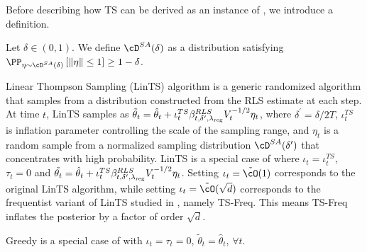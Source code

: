Before describing how TS can be derived as an instance of \POFUL{}, we introduce a definition.
%
\begin{definition}
Let $\delta \in (0,1)$. We define $\cD^{SA}(\delta)$ as a distribution satisfying 
	$	 
	\PP_{\eta \sim \cD^{SA}(\delta)}\left[\|\eta\| \leq 1\right] \geq 1 - \delta
	$.
\end{definition}


\begin{example}[TS]\label{ex:ts}	Linear Thompson Sampling (LinTS) algorithm is a generic randomized algorithm that samples from a distribution constructed from the RLS estimate at each step. At time $t$, LinTS samples as 
%
$
\tilde{\theta}_{t}  =\hat{\theta}_t +\iota^{TS}_t \beta_{t,\delta^\prime, \lambda_{\text{reg}}}^{RLS}  V_t^{-1/2} \eta_t
$,
%
where $\delta^\prime = \delta/2T$,  $\iota^{TS}_t$ is inflation parameter controlling the scale of the sampling range, and $\eta_t$ is a random sample from a normalized sampling distribution $\cD^{SA}(\delta^\prime)$ that concentrates with high probability. LinTS is a special case of \POFUL{} where  $\iota_t = \iota^{TS}_t$, $\tau_t = 0$ and 
$
\tilde{\theta_t} = \hat{\theta}_t +\iota^{TS}_t \beta_{t,\delta^\prime, \lambda_{\text{reg}}}^{RLS}  V_t^{-1/2} \eta_t
$.
%
Setting  $\iota_t = \tilde{\cO}(1)$ corresponds to the original LinTS algorithm, while  setting $\iota_t= \tilde{\cO}(\sqrt{d})$  corresponds to the frequentist variant of LinTS studied in \cite{agrawal2013thompson,abeille2017linear}, namely TS-Freq. This means TS-Freq inflates the posterior by a factor of order $\sqrt{d}$.
\end{example}

\begin{example}[Greedy]\label{ex:greedy}
Greedy is a special case of \POFUL{} with $\iota_t = \tau_t = 0$, $\tilde{\theta}_t = \hat{\theta}_t$,  $\forall t$.
\end{example}




























